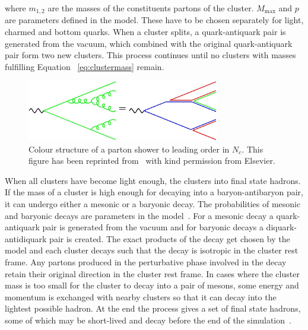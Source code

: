 \noindent where $m_{1,2}$ are the masses of the constituents partons of the cluster. $M_\mathrm{max}$ and $p$ are parameters defined in the model. These have to be chosen separately for light, charmed and bottom quarks. When a cluster splits, a quark-antiquark pair is generated from the vacuum, which combined with the original quark-antiquark pair form two new clusters. This process continues until no clusters with masses fulfilling Equation ~\ref{eq:clustermass} remain.

\begin{figure}
\centering
\includegraphics[width=0.75\textwidth]{figures/planar.jpg}
\caption[]{ Colour structure of a parton shower to leading order in $N_c$. This figure has been reprinted from~\cite{eventGenerators} with kind permission from Elsevier.}
\label{fig:colourstructure}
\end{figure}

When all clusters have become light enough, the clusters into final state hadrons. If the mass of a cluster is high enough for decaying into a baryon-antibaryon pair, it can undergo either a mesonic or a baryonic decay. The probabilities of mesonic and baryonic decays are parameters in the model~\cite{herwigManual}. For a mesonic decay a quark-antiquark pair is generated from the vacuum and for baryonic decays a diquark-antidiquark pair is created. The exact products of the decay get chosen by the model and each cluster decays such that the decay is isotropic in the cluster rest frame. Any partons produced in the perturbative phase involved in the decay retain their original direction in the cluster rest frame. In cases where the cluster mass is too small for the cluster to decay into a pair of mesons, some energy and momentum is exchanged with nearby clusters so that it can decay into the lightest possible hadron. At the end the process gives a set of final state hadrons, some of which may be short-lived and decay before the end of the simulation~\cite{herwigManual}.

